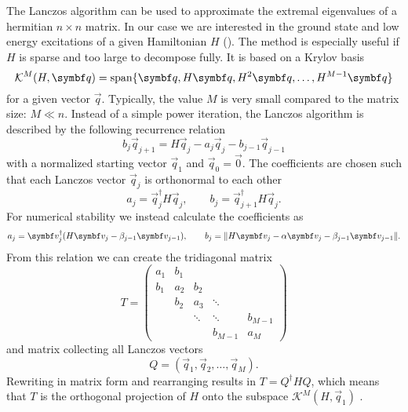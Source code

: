 The Lanczos algorithm \cite{Lanczos1950} can be used to approximate the extremal eigenvalues
of a hermitian $n\times n$ matrix.
In our case we are interested in the ground state and low energy excitations of a
given Hamiltonian $H$ ().
The method is especially useful if $H$ is sparse and too large to decompose fully.
It is based on a Krylov basis
\begin{equation}
    \mathcal{K}^M(H, \vec{q}) = \spn\{\vec{q}, H\vec{q}, H^2\vec{q}, \ldots, H^{M-1}\vec{q}\}
\end{equation}
for a given vector $\vec{q}$.
Typically, the value $M$ is very small compared to the matrix size: $M \ll n$.
Instead of a simple power iteration, the Lanczos algorithm is described by the
following recurrence relation
\begin{equation}
    b_j\vec{q}_{j+1} = H\vec{q}_j - a_j\vec{q}_j - b_{j-1}\vec{q}_{j-1}
    \label{eq:Lanczos-recurrence}
\end{equation}
with a normalized starting vector $\vec{q}_1$ and $\vec{q}_0 = \vec{0}$.
The coefficients are chosen such that each Lanczos vector $\vec{q}_j$ is orthonormal to each other
\begin{equation}
    a_j = \vec{q}_j^\dag H \vec{q}_j,
    \qquad
    b_j = \vec{q}_{j+1}^\dag H \vec{q}_j.
\end{equation}
For numerical stability \cite{Paige1972, Paige1976}
we instead calculate the coefficients as
\begin{equation}
    a_j = \vec{v}_j^\dag(H \vec{v}_j - \beta_{j-1}\vec{v}_{j-1}),
    \qquad
    b_j = \norm{H\vec{v}_j - \alpha\vec{v}_j -  \beta_{j-1}\vec{v}_{j-1}}.
\end{equation}
From this relation we can create the tridiagonal matrix
\begin{equation}
    T
    =
    \begin{pmatrix}
        a_1 & b_1 &        &         &         \\
        b_1 & a_2 & b_2    &         &         \\
            & b_2 & a_3    & \ddots  &         \\
            &     & \ddots & \ddots  & b_{M-1} \\
            &     &        & b_{M-1} & a_M
    \end{pmatrix}
    \label{eq:tridiagonal-scalar}
\end{equation}
and matrix collecting all Lanczos vectors
\begin{equation}
    Q = (\vec{q}_1, \vec{q}_2, \ldots, \vec{q}_M).
\end{equation}
Rewriting  in matrix form and rearranging results in $T = Q^\dag H Q$,
which means that $T$ is the orthogonal projection of $H$ onto
the subspace $\mathcal{K}^M(H, \vec{q}_1)$ \cite{Cullum1985}.

